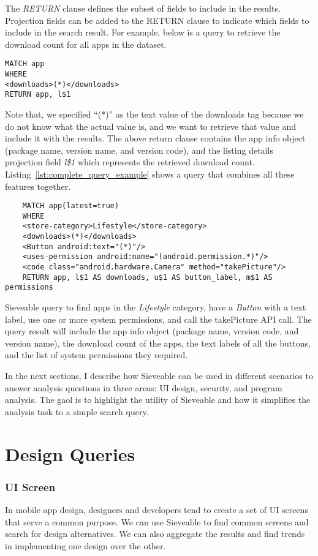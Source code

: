 The \textit{RETURN} clause defines the subset of fields to include in the results.
Projection fields can be added to the RETURN clause to indicate which fields to include in the search result.
For example, below is a query to retrieve the download count for all apps in the dataset.
\begin{verbatim}
MATCH app
WHERE
<downloads>(*)</downloads>
RETURN app, l$1
\end{verbatim}
Note that, we specified ``(*)'' as the text value of the downloads tag because we do not know what the actual value is, and we want to retrieve that value and include it with the results.
The above return clause contains the app info object (package name, version name, and version code), and the listing details projection field \textit{l\$1} which represents the retrieved download count.
Listing~\ref{lst:complete_query_example} shows a query that combines all these features together.
\begin{listing}[ht]
	\begin{verbatim}
	MATCH app(latest=true)
	WHERE
	<store-category>Lifestyle</store-category>
	<downloads>(*)</downloads>
	<Button android:text="(*)"/>
	<uses-permission android:name="(android.permission.*)"/>
	<code class="android.hardware.Camera" method="takePicture"/>
	RETURN app, l$1 AS downloads, u$1 AS button_label, m$1 AS permissions
	\end{verbatim}
	\caption{Sieveable query to find apps in the \textit{Lifestyle} category, have a \textit{Button} with a text label, use one or more system permissions, and call the takePicture API call. The query result will include the app info object (package name, version code, and version name), the download count of the apps, the text labels of all the buttons, and the list of system permissions they required.}
	\label{lst:complete_query_example}
\end{listing}

In the next sections, I describe how Sieveable can be used in different scenarios to answer analysis questions in three areas: UI design, security, and program analysis.
The gaol is to highlight the utility of Sieveable and how it simplifies the analysis task to a simple search query. 

\section{Design Queries}
\subsubsection{UI Screen}
In mobile app design, designers and developers tend to create a set of UI screens that serve a common purpose. 
We can use Sieveable to find common screens and search for design alternatives.
We can also aggregate the results and find trends in implementing one design over the other.


